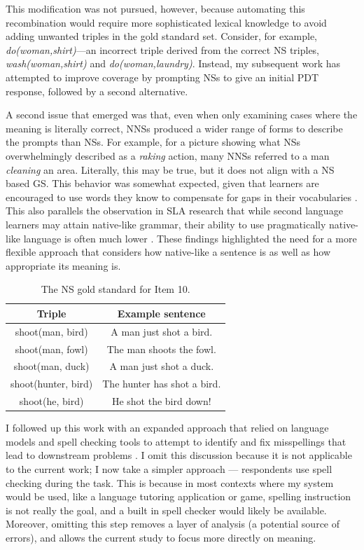 This modification was not pursued, however, because automating this recombination
would require more sophisticated lexical knowledge to avoid adding unwanted
triples in the gold standard set.  Consider, for example,
\textit{do(woman,shirt)}---an incorrect triple derived from the
correct NS triples, \textit{wash(woman,shirt)} and
\textit{do(woman,laundry)}. Instead, my subsequent work has attempted to improve coverage by prompting NSs to give an initial PDT response, followed by a second alternative.

A second issue that emerged was that, even when only examining cases
where the meaning is literally correct, NNSs produced a wider range of
forms to describe the prompts than NSs.  For example, for a picture
showing what NSs overwhelmingly described as a \textit{raking} action,
many NNSs referred to a man \textit{cleaning} an area.  Literally,
this may be true, but it does not align with a NS based GS. 
This behavior was somewhat expected, given that learners are encouraged
to use words they know to compensate for gaps in their vocabularies
\citep{AgustinLlach2010}. This also parallels the observation in SLA research that while second
language learners may attain native-like grammar, their ability to use
pragmatically native-like language is often much lower
\citep{BardoviDornyei1998}. 
These findings highlighted the need for a more flexible approach that considers how native-like a sentence is as well as how appropriate its meaning is.

\begin{table}[htb!]
\begin{center}
\begin{tabular}{|c|c|}
\hline
Triple & Example sentence \\
\hline
\hline
shoot(man, bird) & A man just shot a bird. \\
 \hline
shoot(man, fowl) & The man shoots the fowl. \\
 \hline
shoot(man, duck) & A man just shot a duck. \\
 \hline
shoot(hunter, bird) & The hunter has shot a bird. \\
 \hline
shoot(he, bird) & He shot the bird down! \\
 \hline
 \end{tabular}
\end{center}
\caption{The NS gold standard for Item 10.}
\label{tab:item10GS}
\end{table}

I followed up this work with an expanded approach that relied on language models and spell checking tools to attempt to identify and fix misspellings that lead to downstream problems \citep{king:dickinson:14}. I omit this discussion because it is not applicable to the current work; I now take a simpler approach --- respondents use spell checking during the task. This is because in most contexts where my system would be used, like a language tutoring application or game, spelling instruction is not really the goal, and a built in spell checker would likely be available. Moreover, omitting this step removes a layer of analysis (a potential source of errors), and allows the current study to focus more directly on meaning.

